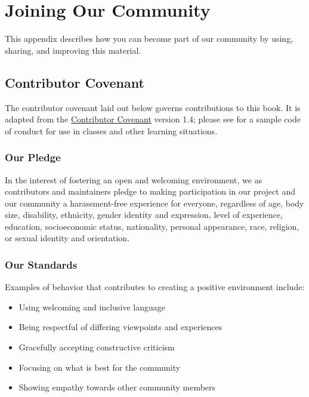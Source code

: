 \chapter{Joining Our Community}\label{s:joining}

This appendix describes how you can become part of our community by
using, sharing, and improving this material.

\section{Contributor Covenant}\label{s:joining-covenant}

The contributor covenant laid out below governs contributions to this
book.  It is adapted from the
\href{https://www.contributor-covenant.org}{Contributor Covenant}
version 1.4; please see  for a sample code of
conduct for use in classes and other learning situations.

\subsection*{Our Pledge}

In the interest of fostering an open and welcoming environment, we as
contributors and maintainers pledge to making participation in our
project and our community a harassment-free experience for everyone,
regardless of age, body size, disability, ethnicity, gender identity
and expression, level of experience, education, socioeconomic status,
nationality, personal appearance, race, religion, or sexual identity
and orientation.

\subsection*{Our Standards}

Examples of behavior that contributes to creating a positive
environment include:

\begin{itemize}
\item
  Using welcoming and inclusive language
\item
  Being respectful of differing viewpoints and experiences
\item
  Gracefully accepting constructive criticism
\item
  Focusing on what is best for the community
\item
  Showing empathy towards other community members
\end{itemize}

